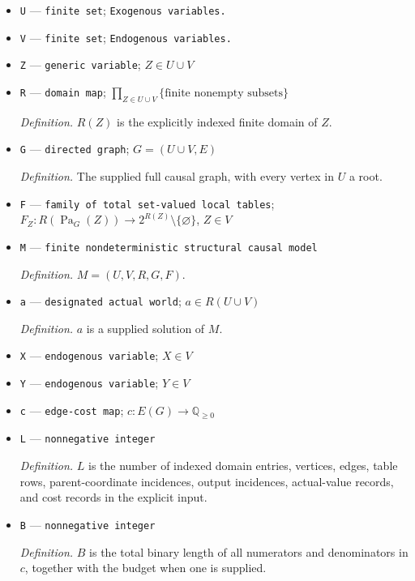 \documentclass{article}
\begin{document}
\begin{itemize}
  \item \texttt{U} --- \texttt{finite set}; \texttt{Exogenous variables.}
  \item \texttt{V} --- \texttt{finite set}; \texttt{Endogenous variables.}
  \item \texttt{Z} --- \texttt{generic variable}; \(Z\in U\cup V\)
  \item \texttt{R} --- \texttt{domain map}; \(\prod_{Z\in U\cup V}\{\text{finite nonempty subsets}\}\)
  \par\smallskip\noindent\emph{Definition.} \(R(Z)\) is the explicitly indexed finite domain of \(Z\).
  \item \texttt{G} --- \texttt{directed graph}; \(G=(U\cup V,E)\)
  \par\smallskip\noindent\emph{Definition.} The supplied full causal graph, with every vertex in \(U\) a root.
  \item \texttt{F} --- \texttt{family of total set-\allowbreak{}valued local tables}; \(F_Z:R(\operatorname{Pa}_G(Z))\to 2^{R(Z)}\setminus\{\varnothing\}\), \(Z\in V\)
  \item \texttt{M} --- \texttt{finite nondeterministic structural causal model}
  \par\smallskip\noindent\emph{Definition.} \(M=(U,V,R,G,F)\).
  \item \texttt{a} --- \texttt{designated actual world}; \(a\in R(U\cup V)\)
  \par\smallskip\noindent\emph{Definition.} \(a\) is a supplied solution of \(M\).
  \item \texttt{X} --- \texttt{endogenous variable}; \(X\in V\)
  \item \texttt{Y} --- \texttt{endogenous variable}; \(Y\in V\)
  \item \texttt{c} --- \texttt{edge-\allowbreak{}cost map}; \(c:E(G)\to\mathbb{Q}_{\ge 0}\)
  \item \texttt{L} --- \texttt{nonnegative integer}
  \par\smallskip\noindent\emph{Definition.} \(L\) is the number of indexed domain entries, vertices, edges, table rows, parent-coordinate incidences, output incidences, actual-value records, and cost records in the explicit input.
  \item \texttt{B} --- \texttt{nonnegative integer}
  \par\smallskip\noindent\emph{Definition.} \(B\) is the total binary length of all numerators and denominators in \(c\), together with the budget when one is supplied.

\end{itemize}
\end{document}
